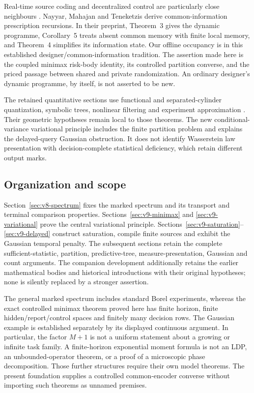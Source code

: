 Real-time source coding and decentralized control are particularly close
neighbours \cite{Witsenhausen1979,LinderYuksel2014,WoodLinderYuksel2017}.
Nayyar, Mahajan and Teneketzis \cite{NayyarMahajanTeneketzis2013} derive
common-information prescription recursions. In their preprint, Theorem~3
gives the dynamic programme, Corollary~5 treats absent common memory
with finite local memory, and Theorem~4 simplifies its information state.
Our offline occupancy is in this established designer/common-information
tradition. The assertion made here is the coupled minimax risk-body
identity, its controlled partition converse, and the priced passage
between shared and private randomization. An ordinary designer's dynamic
programme, by itself, is not asserted to be new.

The retained quantitative sections use functional and separated-cylinder
quantization, symbolic trees, nonlinear filtering and experiment
approximation \cite{LuschgyPages2004,Roychowdhury2014,KZ2017,Tunstall1967,DKYAC2024}.
Their geometric hypotheses remain local to those theorems. The new
conditional-variance variational principle includes the finite partition
problem and explains the delayed-query Gaussian obstruction. It does
not identify Wasserstein law presentation with decision-complete
statistical deficiency, which retain different output marks.

\subsection{Organization and scope}
Section~\ref{sec:v8-spectrum} fixes the marked spectrum and its transport
and terminal comparison properties. Sections~\ref{sec:v9-minimax} and
\ref{sec:v9-variational} prove the central variational principle.
Sections~\ref{sec:v9-saturation}--\ref{sec:v9-delayed} construct saturation,
compile finite sources and exhibit the Gaussian temporal penalty.
The subsequent sections retain the complete sufficient-statistic,
partition, predictive-tree, measure-presentation, Gaussian and count
arguments. The companion development additionally retains the earlier
mathematical bodies and historical introductions with their original
hypotheses; none is silently replaced by a stronger assertion.

The general marked spectrum includes standard Borel experiments, whereas
the exact controlled minimax theorem proved here has finite horizon,
finite hidden/report/control spaces and finitely many decision rows.
The Gaussian example is established separately by its displayed
continuous argument. In particular, the factor $M+1$ is not a uniform
statement about a growing or infinite task family. A finite-horizon
exponential moment formula is not an LDP, an unbounded-operator theorem,
or a proof of a microscopic phase decomposition. Those further
structures require their own model theorems. The present foundation
supplies a controlled common-encoder converse without importing such
theorems as unnamed premises.
